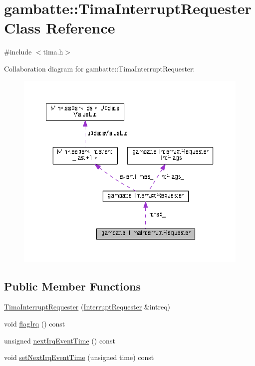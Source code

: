 \hypertarget{classgambatte_1_1TimaInterruptRequester}{}\section{gambatte\+:\+:Tima\+Interrupt\+Requester Class Reference}
\label{classgambatte_1_1TimaInterruptRequester}


{\ttfamily \#include $<$tima.\+h$>$}



Collaboration diagram for gambatte\+:\+:Tima\+Interrupt\+Requester\+:
\nopagebreak
\begin{figure}[H]
\begin{center}
\leavevmode
\includegraphics[width=350pt]{classgambatte_1_1TimaInterruptRequester__coll__graph}
\end{center}
\end{figure}
\subsection*{Public Member Functions}
\begin{DoxyCompactItemize}
\item 
\hyperlink{classgambatte_1_1TimaInterruptRequester_a3e26489e088447e04d49bf0838b90feb}{Tima\+Interrupt\+Requester} (\hyperlink{classgambatte_1_1InterruptRequester}{Interrupt\+Requester} \&intreq)
\item 
void \hyperlink{classgambatte_1_1TimaInterruptRequester_aeee10b6564330e027830d10cabf41ffe}{flag\+Irq} () const
\item 
unsigned \hyperlink{classgambatte_1_1TimaInterruptRequester_ae2754e252883a78831d18007878fcde4}{next\+Irq\+Event\+Time} () const
\item 
void \hyperlink{classgambatte_1_1TimaInterruptRequester_a23d93553824a9639e1080ee2c593ab65}{set\+Next\+Irq\+Event\+Time} (unsigned time) const
\end{DoxyCompactItemize}
